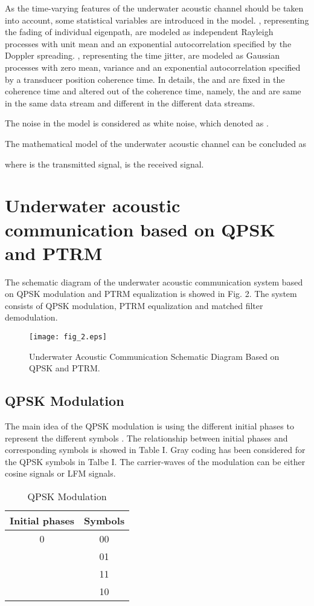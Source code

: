 \documentclass[journal]{IEEEtran}
\begin{document}
As the time-varying features of the underwater acoustic channel
should be taken into account, some statistical variables are
introduced in the model. , representing the fading of
individual eigenpath, are modeled as independent Rayleigh processes
with unit mean and an exponential autocorrelation specified by the
Doppler spreading. , representing the time jitter, are modeled
as Gaussian processes with zero mean, variance  and an
exponential autocorrelation specified by a transducer position
coherence time. In details, the  and  are fixed in the
coherence time and altered out of the coherence time, namely, the
 and  are same in the same data stream and different in
the different data streams.


The noise in the model is considered as white noise, which denoted
as .

The mathematical model of the underwater acoustic channel can be
concluded as

where  is the transmitted signal,  is the received
signal.
\section{Underwater acoustic communication based on QPSK and PTRM}
The schematic diagram of the underwater acoustic communication
system based on QPSK modulation and PTRM equalization is showed in
Fig. 2. The system consists of QPSK modulation, PTRM equalization
and matched filter demodulation.
\begin{figure}[!t]
\centering
\texttt{[image: fig\_2.eps]}
\caption{Underwater Acoustic Communication Schematic Diagram Based
on QPSK and PTRM.} \label{fig_sim}
\end{figure}
\subsection{QPSK Modulation}
The main idea of the QPSK modulation is using the different initial
phases to represent the different symbols \cite{Goldsmith2005}. The
relationship between initial phases and corresponding symbols is
showed in Table I. Gray coding has been considered for the QPSK
symbols in Talbe I. The carrier-waves of the modulation can be
either cosine signals or LFM signals.
\begin{table}[!t]
\renewcommand{\arraystretch}{1.3}
\caption{QPSK Modulation} \label{table_example} \centering
\begin{tabular}{c||c}
\hline
\bfseries Initial phases & \bfseries Symbols\\
\hline\hline
0                                                                                            &   00   \\
            &   01   \\
                                                                                        &   11   \\
      &   10   \\
\hline
\end{tabular}
\end{table}
\end{document}
